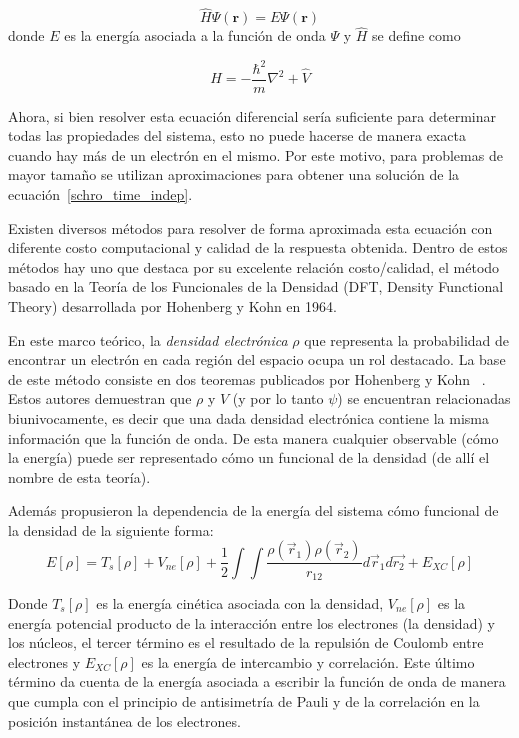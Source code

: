 \begin{equation}
    \label{schro_time_indep}
    \hat{H} \Psi(\mathbf{r}) = E \Psi(\mathbf{r})
\end{equation}
donde $E$ es la energ\'ia asociada a la funci\'on de onda $\Psi$ y $\hat{H}$ se define como

\begin{equation*}
    \hat{H} =  -\frac{\hbar^2}{m} \nabla^2 + \hat{V}
\end{equation*}


Ahora, si bien resolver esta ecuaci\'on diferencial ser\'ia suficiente para determinar todas las propiedades del sistema, esto no puede hacerse de
manera exacta cuando hay m\'as de un electr\'on en el mismo. Por este motivo, para problemas de mayor tama\~no se utilizan aproximaciones
para obtener una soluci\'on de la ecuaci\'on~\ref{schro_time_indep}.

Existen diversos m\'etodos para resolver de forma aproximada esta ecuaci\'on con diferente costo computacional y calidad de la respuesta obtenida.
Dentro de estos m\'etodos hay uno que destaca por su excelente relaci\'on costo/calidad, el m\'etodo basado en la Teor\'ia de los Funcionales de la Densidad (DFT, Density Functional Theory) desarrollada por Hohenberg y Kohn en 1964.

En este marco te\'orico, la \textit{densidad electr\'onica} $\rho$ que representa la probabilidad de encontrar un electr\'on en cada regi\'on del espacio ocupa un rol destacado.
La base de este m\'etodo consiste en dos teoremas publicados por Hohenberg y Kohn ~\cite{HohenbergKohn}.
Estos autores demuestran que $\rho$ y $V$ (y por lo tanto $\psi$) se encuentran relacionadas biunivocamente,
es decir que una dada densidad electr\'onica contiene la misma informaci\'on que la funci\'on de onda.
De esta manera cualquier observable (c\'omo la energ\'ia) puede ser representado c\'omo un funcional de la densidad (de all\'i el nombre de esta teor\'ia).

Adem\'as propusieron la dependencia de la energ\'ia del sistema c\'omo funcional de la densidad de la siguiente forma:
\begin{equation}
    \label{hohenberg_kohn_energy}
    E[\rho] = T_s[\rho] + V_{ne}[\rho] + \frac{1}{2} \int \int \frac{\rho(\vec{r}_1) \rho(\vec{r}_2)}{r_{12}} d\vec{r}_1 d\vec{r_2} + E_{XC}[\rho]
\end{equation}

Donde $T_s[\rho]$ es la energ\'ia cin\'etica asociada con la densidad, $V_{ne}[\rho]$ es la energ\'ia potencial producto de la interacci\'on entre los
electrones (la densidad) y los n\'ucleos, el tercer t\'ermino es el resultado de la repulsi\'on de Coulomb entre electrones y $E_{XC}[\rho]$ es la
energ\'ia de intercambio y correlaci\'on. Este \'ultimo t\'ermino da cuenta de la energ\'ia asociada a escribir la funci\'on de onda de manera que cumpla con el principio de antisimetr\'ia de Pauli y de la correlaci\'on
en la posici\'on instant\'anea de los electrones.

